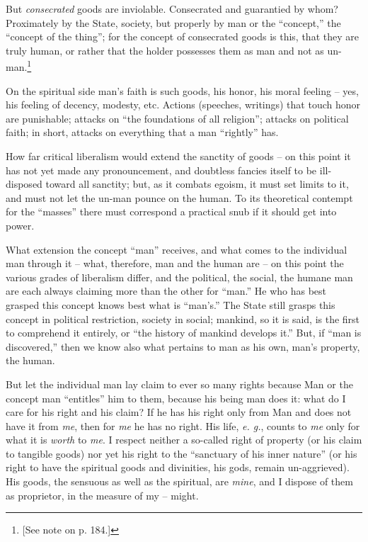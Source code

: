 \documentclass[12pt,a4paper]{book}
\begin{document}
But \textit{consecrated} goods are inviolable. Consecrated and guarantied by 
whom? Proximately by the State, society, but properly by man or the 
``concept,'' the ``concept of the thing''; for the concept of consecrated 
goods is this, that they are truly human, or rather that the holder possesses 
them as man and not as un-man.\footnote{[See note on p. 184.]}

On the spiritual side man's faith is such goods, his honor, his moral feeling 
-- yes, his feeling of decency, modesty, etc. Actions (speeches, writings) 
that touch honor are punishable; attacks on ``the foundations of all 
religion''; attacks on political faith; in short, attacks on everything that 
a man ``rightly'' has.

How far critical liberalism would extend the sanctity of goods -- on this 
point it has not yet made any pronouncement, and doubtless fancies itself to 
be ill-disposed toward all sanctity; but, as it combats egoism, it must set 
limits to it, and must not let the un-man pounce on the human. To its 
theoretical contempt for the ``masses'' there must correspond a practical 
snub if it should get into power.

What extension the concept ``man'' receives, and what comes to the 
individual man through it -- what, therefore, man and the human are -- on this 
point the various grades of liberalism differ, and the political, the social, 
the humane man are each always claiming more than the other for ``man.'' He 
who has best grasped this concept knows best what is ``man's.'' The State 
still grasps this concept in political restriction, society in social; 
mankind, so it is said, is the first to comprehend it entirely, or ``the 
history of mankind develops it.'' But, if ``man is discovered,'' then we 
know also what pertains to man as his own, man's property, the human.

But let the individual man lay claim to ever so many rights because Man or the 
concept man ``entitles'' him to them, because his being man does it: what do 
I care for his right and his claim? If he has his right only from Man and does 
not have it from \textit{me}, then for \textit{me} he has no right. His life, 
\textit{e. g.}, counts to \textit{me} only for what it is \textit{worth} to 
\textit{me}. I respect neither a so-called right of property (or his claim to 
tangible goods) nor yet his right to the ``sanctuary of his inner nature'' 
(or his right to have the spiritual goods and divinities, his gods, remain 
un-aggrieved). His goods, the sensuous as well as the spiritual, are 
\textit{mine}, and I dispose of them as proprietor, in the measure of my -- 
might.
\end{document}
